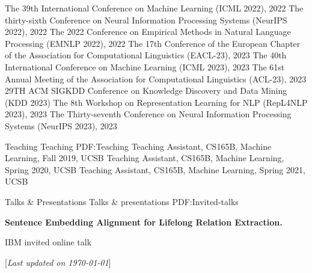 \documentclass[letterpaper,MMMyyyy,nonstopmode]{simpleresumecv}
\newcommand{\CVNote}{Last updated on {\today}}
\begin{document}
\begin{Body}
    \BulletItem The 39th International Conference on Machine Learning (ICML 2022), 2022
    \BulletItem The thirty-sixth Conference on Neural Information Processing Systems (NeurIPS 2022), 2022
    \BulletItem The 2022 Conference on Empirical Methods in Natural Language Processing (EMNLP 2022), 2022
    \BulletItem The 17th Conference of the European Chapter of the Association for Computational Linguistics (EACL-23), 2023
    \BulletItem The 40th International Conference on Machine Learning (ICML 2023), 2023
    \BulletItem The 61st Annual Meeting of the Association for Computational Linguistics (ACL-23), 2023
    \BulletItem 29TH ACM SIGKDD Conference on Knowledge Discovery and Data Mining (KDD 2023)
    \BulletItem The 8th Workshop on Representation Learning for NLP (RepL4NLP 2023), 2023
    \BulletItem The Thirty-seventh Conference on Neural Information Processing Systems (NeurIPS 2023), 2023

\Section
{Teaching}
{Teaching}
{PDF:Teaching}
\BulletItem Teaching Assistant, CS165B, Machine Learning, Fall 2019, UCSB
\BulletItem Teaching Assistant, CS165B, Machine Learning, Spring 2020, UCSB
\BulletItem Teaching Assistant, CS165B, Machine Learning, Spring 2021, UCSB

\Section
{Talks \& \newline Presentations}
{Talks \& presentations}
{PDF:Invited-talks}

\Entry \textbf{Sentence Embedding Alignment for Lifelong Relation Extraction.} \hfill {}
\begin{Detail}
\BulletItem
IBM invited online talk
\end{Detail}
\end{Body}


\UseNoteFont%
\null\hfill%
[\textit{\CVNote}]
\end{document}
